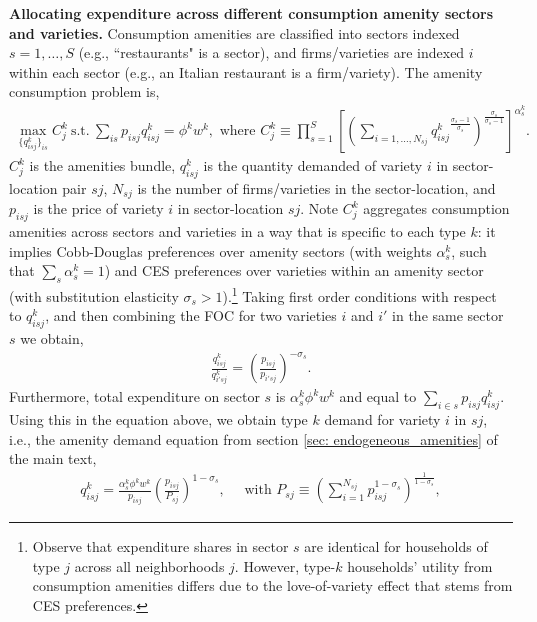 \documentclass[11pt]{article}
\newcommand{\Paragraph}{\vspace{0.1cm}\noindent\textbf}
\begin{document}
\Paragraph{Allocating expenditure across different consumption amenity sectors and varieties.} Consumption amenities are classified into sectors indexed $s=1,\dots, S$ (e.g., ``restaurants" is a sector), and firms/varieties are indexed $i$ within each sector (e.g., an Italian restaurant is a firm/variety). The amenity consumption problem is, 
\begin{align}\label{eq: amenities derivation varieties}
\max_{\{q_{isj}^k\}_{is}}   C^k_{j} \ \text{s.t.} \ \sum_{is} p_{isj} q_{isj}^k= \phi^k w^k, \text{ where }  C^k_{j} \equiv \prod_{s=1}^{S} \left[ \left(\sum_{i=1,\dots,N_{sj}} {q_{isj}^k}^{\frac{\sigma_s-1}{\sigma_s}}\right)^{\frac{\sigma_s}{\sigma_s-1}}\right]^{\alpha^k_{s}}.
\end{align}
$C^k_{j}$ is the amenities bundle, $q_{isj}^k$ is the quantity demanded of variety $i$ in sector-location pair $sj$, $N_{sj}$ is the number of firms/varieties in the sector-location, and $p_{isj}$ is the price of variety $i$ in sector-location $sj$. Note $C^k_j$ aggregates consumption amenities across sectors and varieties in a way that is specific to each type $k$: it implies Cobb-Douglas preferences over amenity sectors (with weights $\alpha^k_{s}$, such that $\sum_s \alpha^k_s = 1$) and CES preferences over varieties within an amenity sector (with substitution elasticity $\sigma_s>1$).\footnote{Observe that expenditure shares in sector $s$ are identical for households of type $j$ across all neighborhoods $j$. However, type-$k$ households' utility from consumption amenities differs due to the love-of-variety effect that stems from CES preferences.} Taking first order conditions with respect to $q_{isj}^k$, and then combining the FOC for two varieties $i$ and $i'$ in the same sector $s$ we obtain,
\begin{align*}
    \frac{q_{isj}^k}{q_{i'sj}^k} = \left( \frac{p_{isj}}{p_{i'sj}} \right)^{-\sigma_s}.
\end{align*}
Furthermore, total expenditure on sector $s$ is $\alpha^k_{s} \phi^k w^k$ and equal to $\sum_{i \in s} p_{isj}q_{isj}^k$. Using this in the equation above, we obtain type $k$ demand for variety $i$ in $sj$, i.e., the amenity demand equation from section \ref{sec: endogeneous_amenities} of the main text,
\begin{align*}
    q_{isj}^k = \frac{\alpha^k_{s} \phi^k w^k}{p_{isj}} \left(\frac{p_{isj}}{P_{sj}}\right)^{1-\sigma_s}, \quad \text{ with } P_{sj} \equiv \left(\sum_{i=1}^{N_{sj}} p_{isj}^{1-\sigma_s} \right)^{\frac{1}{1-\sigma_s}},
\end{align*}
\end{document}
